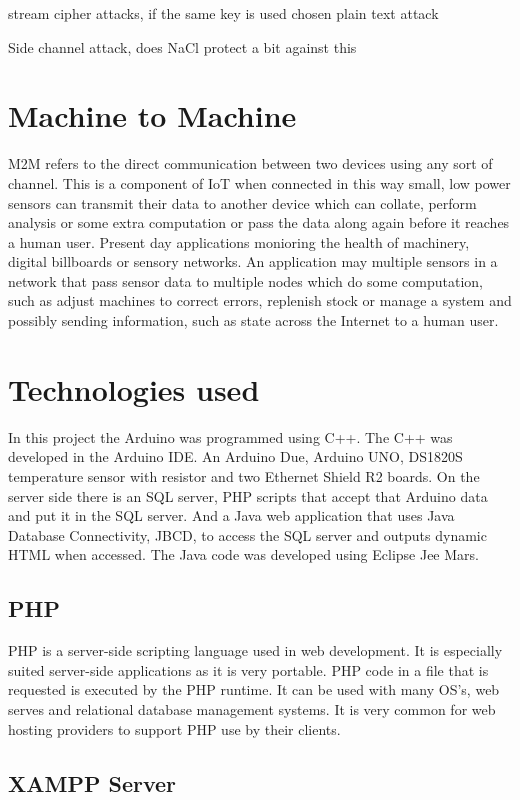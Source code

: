stream cipher attacks, if the same key is used
chosen plain text attack

Side channel attack, does NaCl protect a bit against this

\section{Machine to Machine}

M2M refers to the direct communication between two devices using any sort of channel. This is a component of IoT when connected in this way small, low power sensors can transmit their data to another device which can collate, perform analysis or some extra computation or pass the data along again before it reaches a human user. Present day applications monioring the health of machinery, digital billboards or sensory networks. An application may multiple sensors in a network that pass sensor data to multiple nodes which do some computation, such as adjust machines to correct errors, replenish stock or manage a system and possibly sending information, such as state across the Internet to a human user.

\section{Technologies used}

In this project the Arduino was programmed using C++. The C++ was developed in the Arduino IDE. An Arduino Due, Arduino UNO, DS1820S temperature sensor with resistor and two Ethernet Shield R2 boards. On the server side there is an SQL server, PHP scripts that accept that Arduino data and put it in the SQL server. And a Java web application that uses Java Database Connectivity, JBCD, to access the SQL server and outputs dynamic HTML when accessed. The Java code was developed using Eclipse Jee Mars.

\subsection{PHP}
PHP is a server-side scripting language used in web development. It is especially suited server-side applications as it is very portable. PHP code in a file that is requested is executed by the PHP runtime. It can be used with many OS's, web serves and relational database management systems. It is very common for web hosting providers to support PHP use by their clients.

\subsection{XAMPP Server}

